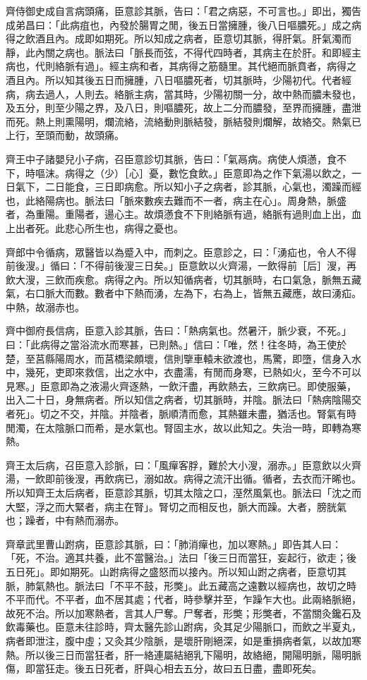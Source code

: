 \begin{pinyinscope}
齊侍御史成自言病頭痛，臣意診其脈，告曰：「君之病惡，不可言也。」即出，獨告成弟昌曰：「此病疽也，內發於腸胃之閒，後五日當擁腫，後八日嘔膿死。」成之病得之飲酒且內。成即如期死。所以知成之病者，臣意切其脈，得肝氣。肝氣濁而靜，此內關之病也。脈法曰「脈長而弦，不得代四時者，其病主在於肝。和即經主病也，代則絡脈有過」。經主病和者，其病得之筋髓里。其代絕而脈賁者，病得之酒且內。所以知其後五日而擁腫，八日嘔膿死者，切其脈時，少陽初代。代者經病，病去過人，人則去。絡脈主病，當其時，少陽初關一分，故中熱而膿未發也，及五分，則至少陽之界，及八日，則嘔膿死，故上二分而膿發，至界而擁腫，盡泄而死。熱上則熏陽明，爛流絡，流絡動則脈結發，脈結發則爛解，故絡交。熱氣已上行，至頭而動，故頭痛。

齊王中子諸嬰兒小子病，召臣意診切其脈，告曰：「氣鬲病。病使人煩懣，食不下，時嘔沫。病得之（少）［心］憂，數忔食飲。」臣意即為之作下氣湯以飲之，一日氣下，二日能食，三日即病愈。所以知小子之病者，診其脈，心氣也，濁躁而經也，此絡陽病也。脈法曰「脈來數疾去難而不一者，病主在心」。周身熱，脈盛者，為重陽。重陽者，逿心主。故煩懣食不下則絡脈有過，絡脈有過則血上出，血上出者死。此悲心所生也，病得之憂也。

齊郎中令循病，眾醫皆以為蹙入中，而刺之。臣意診之，曰：「湧疝也，令人不得前後溲。」循曰：「不得前後溲三日矣。」臣意飲以火齊湯，一飲得前［后］溲，再飲大溲，三飲而疾愈。病得之內。所以知循病者，切其脈時，右口氣急，脈無五藏氣，右口脈大而數。數者中下熱而湧，左為下，右為上，皆無五藏應，故曰湧疝。中熱，故溺赤也。

齊中御府長信病，臣意入診其脈，告曰：「熱病氣也。然暑汗，脈少衰，不死。」曰：「此病得之當浴流水而寒甚，已則熱。」信曰：「唯，然！往冬時，為王使於楚，至莒縣陽周水，而莒橋梁頗壞，信則擥車轅未欲渡也，馬驚，即墮，信身入水中，幾死，吏即來救信，出之水中，衣盡濡，有閒而身寒，已熱如火，至今不可以見寒。」臣意即為之液湯火齊逐熱，一飲汗盡，再飲熱去，三飲病已。即使服藥，出入二十日，身無病者。所以知信之病者，切其脈時，并陰。脈法曰「熱病陰陽交者死」。切之不交，并陰。并陰者，脈順清而愈，其熱雖未盡，猶活也。腎氣有時閒濁，在太陰脈口而希，是水氣也。腎固主水，故以此知之。失治一時，即轉為寒熱。

齊王太后病，召臣意入診脈，曰：「風癉客脬，難於大小溲，溺赤。」臣意飲以火齊湯，一飲即前後溲，再飲病已，溺如故。病得之流汗出循。循者，去衣而汗晞也。所以知齊王太后病者，臣意診其脈，切其太陰之口，溼然風氣也。脈法曰「沈之而大堅，浮之而大緊者，病主在腎」。腎切之而相反也，脈大而躁。大者，膀胱氣也；躁者，中有熱而溺赤。

齊章武里曹山跗病，臣意診其脈，曰：「肺消癉也，加以寒熱。」即告其人曰：「死，不治。適其共養，此不當醫治。」法曰「後三日而當狂，妄起行，欲走；後五日死」。即如期死。山跗病得之盛怒而以接內。所以知山跗之病者，臣意切其脈，肺氣熱也。脈法曰「不平不鼓，形獘」。此五藏高之遠數以經病也，故切之時不平而代。不平者，血不居其處；代者，時參擊并至，乍躁乍大也。此兩絡脈絕，故死不治。所以加寒熱者，言其人尸奪。尸奪者，形獘；形獘者，不當關灸鑱石及飲毒藥也。臣意未往診時，齊太醫先診山跗病，灸其足少陽脈口，而飲之半夏丸，病者即泄注，腹中虛；又灸其少陰脈，是壞肝剛絕深，如是重損病者氣，以故加寒熱。所以後三日而當狂者，肝一絡連屬結絕乳下陽明，故絡絕，開陽明脈，陽明脈傷，即當狂走。後五日死者，肝與心相去五分，故曰五日盡，盡即死矣。


\end{pinyinscope}
